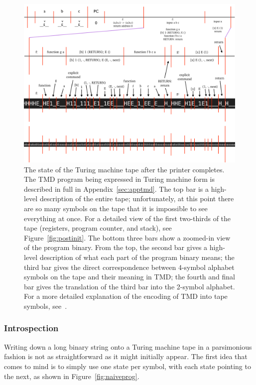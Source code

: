 \documentclass[11pt]{article}
\begin{document}
\begin{figure}
\begin{center}
\includegraphics[scale=0.42]{figs/postprog.png}
\caption{The state of the Turing machine tape after the printer completes. The TMD program being expressed in Turing machine form is described in full in Appendix~\ref{sec:apptmd}. The top bar is a high-level description of the entire tape; unfortunately, at this point there are so many symbols on the tape that it is impossible to see everything at once. For a detailed view of the first two-thirds of the tape (registers, program counter, and stack), see Figure~\ref{fig:postinit}. The bottom three bars show a zoomed-in view of the program binary. From the top, the second bar gives a high-level description of what each part of the program binary means; the third bar gives the direct correspondence between 4-symbol alphabet symbols on the tape and their meaning in TMD; the fourth and final bar gives the translation of the third bar into the 2-symbol alphabet. For a more detailed explanation of the encoding of TMD into tape symbols, see~\cite{github}. \label{fig:postprog}}
\end{center}
\end{figure}

\subsubsection{Introspection}

Writing down a long binary string onto a Turing machine tape in a parsimonious fashion is not as straightforward as it might initially appear. The first idea that comes to mind is to simply use one state per symbol, with each state pointing to the next, as shown in Figure~\ref{fig:naiveprog}. 
\end{document}
